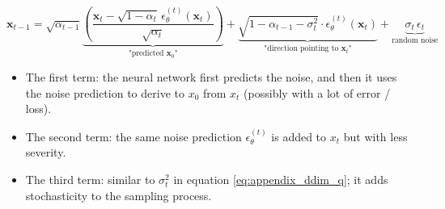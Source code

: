 \begin{equation}
\mathbf{x}_{t-1} = \sqrt{\alpha_{t-1}} \underbrace{\left( \frac{\mathbf{x}_t - \sqrt{1 - \alpha_t} \, \epsilon_{\theta}^{(t)}(\mathbf{x}_t)}{\sqrt{\alpha_t}} \right)}_{\text{"predicted } \mathbf{x}_0\text{"}} + \underbrace{\sqrt{1 - \alpha_{t-1} - \sigma_t^2} \cdot \epsilon_{\theta}^{(t)}(\mathbf{x}_t)}_{\text{"direction pointing to } \mathbf{x}_t\text{"}} + \underbrace{\sigma_t \, \epsilon_t}_{\text{random noise}}
\end{equation}

\begin{itemize}
    \item The first term: the neural network first predicts the noise, and then it uses the noise prediction to derive to $x_0$ from $x_t$ (possibly with a lot of error / loss).
    \item The second term: the same noise prediction $\epsilon_{\theta}^{(t)}$ is added to $x_t$ but with less severity.
    \item The third term: similar to $\sigma_t^2$ in equation \ref{eq:appendix_ddim_q}; it adds stochasticity to the sampling process.
\end{itemize}











